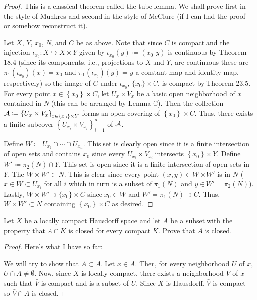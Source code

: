 \begin{proof}
This is a classical theorem called the tube lemma. We shall prove first in
the style of Munkres and second in the style of McClure (if I can find the
proof or somehow reconstruct it).

Let $X$, $Y$, $x_0$, $N$, and $C$ be as above. Note that since $C$ is
compact and the injection $\iota_{x_0}\colon X\hookrightarrow X\times Y$
given by $\iota_{x_0}(y)\coloneqq(x_0,y)$ is continuous by Theorem 18.4 (since
its components, i.e., projections to $X$ and $Y$, are continuous these are
$\pi_1(\iota_{x_0})(x)=x_0$ and $\pi_1(\iota_{x_0})(y)=y$ a constant map
and identity map, respectively) so the image of $C$ under $\iota_{x_0}$,
$\{x_0\}\times C$, is compact by Theorem 23.5. For every point
$x\in\left\{x_0\right\}\times C$, let $U_x\times V_x$ be a basic open
neighborhood of $x$ contained in $N$ (this can be arranged by Lemma
C). Then the collection $\mathcal{A}\coloneqq\left\{U_x\times
  V_x\right\}_{x\in\left\{x_0\right\}\times   Y}$ forms an open covering of
$\left\{x_0\right\}\times C$. Thus, there exists a finite subcover
$\left\{U_{x_i}\times V_{x_i}\right\}_{i=1}^n$ of $\mathcal{A}$.

Define $W\coloneqq U_{x_1}\cap\cdots\cap U_{x_n}$. This set is clearly open
since it is a finite intersection of open sets and contains $x_0$ since
every $U_{x_i}\times V_{x_i}$ intersects $\left\{x_0\right\}\times
Y$. Define $W'\coloneqq\pi_2(N)\cap Y$. This set is open since it is a
finite intersection of open sets in $Y$. The $W\times W'\subset N$. This is
clear since every point $(x,y)\in W\times W'$ is in $N$ ($x\in
W\subset U_{x_i}$ for all $i$ which in turn is a subset of $\pi_1(N)$ and
$y\in W'=\pi_2(N)$). Lastly, $W\times W'\supset \{x_0\}\times C$ since
$x_0\in W$ and $W'=\pi_1(N)\supset C$. Thus, $W\times W'\subset N$
containing $\left\{x_0\right\}\times C$ as desired.
\end{proof}
\begin{problem}
Let $X$ be a locally compact Hausdorff space and let $A$ be a subset with
the property that $A\cap K$ is closed for every compact $K$. Prove that $A$
is closed.
\end{problem}
\begin{proof}
Here's what I have so far:

We will try to show that $\bar A\subset A$. Let $x\in\bar A$. Then, for
every neighborhood $U$ of $x$, $U\cap A\neq\emptyset$. Now, since $X$ is
locally compact, there exists a neighborhood $V$ of $x$ such that $\bar V$
is compact and is a subset of $U$. Since $X$ is Hausdorff, $\bar V$ is
compact so $\bar V\cap A$ is closed.
\end{proof}
